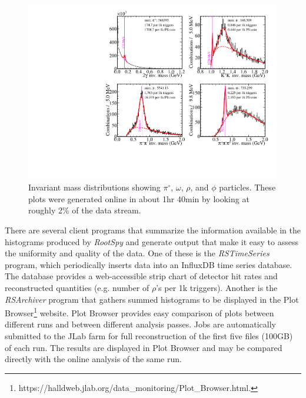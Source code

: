\begin{figure}[tbp]
\begin{center}
\includegraphics[width=0.99\textwidth]{figures/online_monitoring_PID.pdf}
\caption{\label{fig:online_monitoring_PID}Invariant mass distributions showing $\pi^\circ$, $\omega$, $\rho$, and $\phi$ particles. These plots were generated online in about 1hr 40min by looking at roughly 2\% of the data stream.}   
\end{center}  
\end{figure}

There are several client programs that summarize the information available in the histograms produced by \textit{RootSpy} and generate output that make it easy to assess the uniformity and quality of the data. One of these is the \textit{RSTimeSeries} program, which periodically inserts data into an InfluxDB time series database. The database provides a web-accessible strip chart of detector hit rates and reconstructed quantities (e.g. number of $\rho$'s per 1k triggers). Another is the \textit{RSArchiver} program that gathers summed histograms to be displayed in the Plot Browser\footnote{https://halldweb.jlab.org/data\_monitoring/Plot\_Browser.html.} website. Plot Browser provides easy comparison of plots between different runs and between different analysis passes. Jobs are automatically submitted to the JLab farm for full reconstruction of the first five files (100GB) of each run. The results are displayed in Plot Browser and may be compared directly with the online analysis of the same run.


